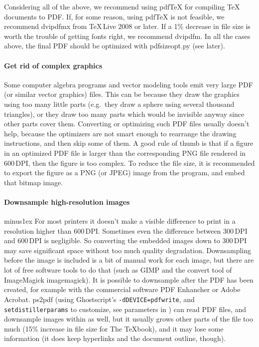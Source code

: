 \documentclass{ltugproc}
\def\cmd{\textsf}
\begin{document}
Considering all of the above, we recommend using pdf\TeX{} for compiling
\TeX{} documents to PDF. If, for some
reason, using pdf\TeX{} is not feasible, we recommend \cmd{dvipdfmx} from
\TeX{}\,Live 2008 or later. If a 1\% decrease in file size is worth the
trouble of getting fonts right, we recommend \cmd{dvipdfm}.
In all the cases above, the final PDF should be optimized with
\cmd{pdfsizeopt.py} (see later).

\paragraph{Get rid of complex graphics}

Some computer algebra programs and vector modeling tools emit very large
PDF (or similar vector graphics) files. This can be because they draw the
graphics using too many little parts (e.g.\ they draw a sphere using several
thousand triangles), or they draw too many parts which would
be invisible anyway since other parts cover them. Converting or
optimizing such PDF files usually doesn't help, because the optimizers are not
smart enough to rearrange the drawing instructions, and then skip some of
them. A good rule of thumb is that if a figure in an optimized PDF file is
larger than the corresponding PNG file rendered in 600\,DPI, then the
figure is too complex. To reduce the file size, it is recommended to 
export the figure as a PNG (or JPEG) image from the program, and embed that
bitmap image.

\paragraph{Downsample high-resolution images}

\vrule width0pt \hskip0pt minus1ex  %
For most printers it doesn't make a visible difference to print in a
resolution higher than 600\,DPI. Sometimes even the difference between
300\,DPI and 600\,DPI is negligible. So converting the embedded images down
to 300\,DPI may save significant space without too much quality degradation.
Downsampling before the image is included is a bit of manual work
for each image, but there are lot of free software tools to do that (such as
GIMP \cite{gimp} and the \cmd{convert} tool of ImageMagick \cmd{imagemagick}).
It is possible to downsample after the PDF has been created, for example
with the commercial software PDF Enhancher \cite{pdfenhancer} or Adobe
Acrobat. \cmd{ps2pdf}
(using Ghostscript's \texttt{-dDEVICE=pdfwrite}, and
\texttt{setdistillerparams} to customize, see parameters in \cite{ps2pdf}) can
read PDF files, and downsample images within as well, but it usually grows
other parts of the file too much (15\% increase in file size for The
\TeX{}book), and it may lose some information (it does
keep hyperlinks and the document outline, though).
\end{document}
